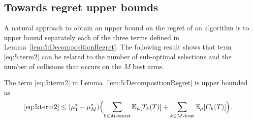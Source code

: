 \subsection{Towards regret upper bounds}
\label{sub:5:towardsRegretUpperBounds}

A natural approach to obtain an upper bound on the regret of an algorithm is to upper bound separately each of the three terms defined in Lemma~\ref{lem:5:DecompositionRegret}.
The following result shows that term \ref{eq:5:term2} can be related to the number of sub-optimal selections and the number of collisions that occurs on the $M$ best arms.

\begin{lemma}\label{lem:5:1stUpperBound}
\begin{leftbar}[lemmabar]  %
  The term \ref{eq:5:term2} in Lemma~\ref{lem:5:DecompositionRegret} is upper bounded as
  \begin{equation}\label{eq:5:1stUpperBound}
    \ref{eq:5:term2} \leq (\mu_1^* - \mu_M^*) \Bigl(    \sum_{k \in M\text{-}\mathrm{worst}} \mathbb{E}_{\mu}[T_k(T)]
    + \sum_{k \in M\text{-}\mathrm{best}} \mathbb{E}_{\mu}[C_{k}(T)]
    \Bigr).
  \end{equation}
\end{leftbar}  %
\end{lemma}

